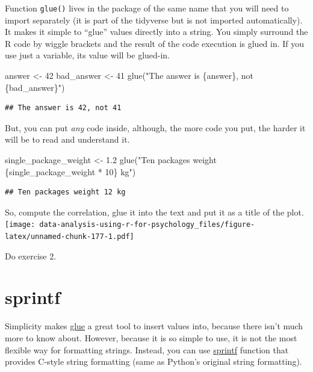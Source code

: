 \documentclass[
]{book}
\newenvironment{Shaded}{\begin{snugshade}}{\end{snugshade}}
\newcommand{\DecValTok}[1]{\textcolor[rgb]{0.00,0.00,0.81}{#1}}
\newcommand{\FloatTok}[1]{\textcolor[rgb]{0.00,0.00,0.81}{#1}}
\newcommand{\FunctionTok}[1]{\textcolor[rgb]{0.00,0.00,0.00}{#1}}
\newcommand{\NormalTok}[1]{#1}
\newcommand{\OtherTok}[1]{\textcolor[rgb]{0.56,0.35,0.01}{#1}}
\newcommand{\StringTok}[1]{\textcolor[rgb]{0.31,0.60,0.02}{#1}}
\begin{document}
Function \texttt{glue()} lives in the package of the same name that you will need to import separately (it is part of the tidyverse but is not imported automatically). It makes it simple to ``glue'' values directly into a string. You simply surround the R code by wiggle brackets and the result of the code execution is glued in. If you use just a variable, its value will be glued-in.

\begin{Shaded}
\begin{Highlighting}[]
\NormalTok{answer }\OtherTok{\textless{}{-}} \DecValTok{42}
\NormalTok{bad\_answer }\OtherTok{\textless{}{-}} \DecValTok{41}
\FunctionTok{glue}\NormalTok{(}\StringTok{"The answer is \{answer\}, not \{bad\_answer\}"}\NormalTok{)}
\end{Highlighting}
\end{Shaded}

\begin{verbatim}
## The answer is 42, not 41
\end{verbatim}

But, you can put \emph{any} code inside, although, the more code you put, the harder it will be to read and understand it.

\begin{Shaded}
\begin{Highlighting}[]
\NormalTok{single\_package\_weight }\OtherTok{\textless{}{-}} \FloatTok{1.2}
\FunctionTok{glue}\NormalTok{(}\StringTok{"Ten packages weight \{single\_package\_weight * 10\} kg"}\NormalTok{)}
\end{Highlighting}
\end{Shaded}

\begin{verbatim}
## Ten packages weight 12 kg
\end{verbatim}

So, compute the correlation, glue it into the text and put it as a title of the plot.
\texttt{[image: data-analysis-using-r-for-psychology\_files/figure-latex/unnamed-chunk-177-1.pdf]}

Do exercise 2.

\hypertarget{sprintf}{%
\section{sprintf}\label{sprintf}}

Simplicity makes \href{https://glue.tidyverse.org/}{glue} a great tool to insert values into, because there isn't much more to know about. However, because it is so simple to use, it is not the most flexible way for formatting strings. Instead, you can use \href{https://stat.ethz.ch/R-manual/R-patched/library/base/html/sprintf.html}{sprintf} function that provides C-style string formatting (same as Python's original string formatting).
\end{document}

